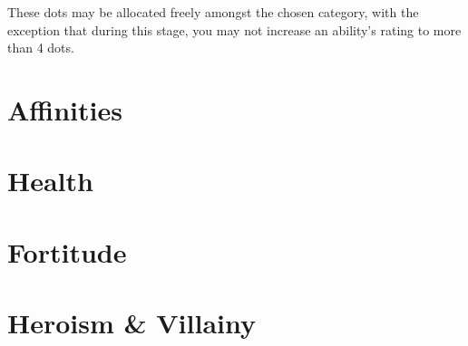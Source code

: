 These dots may be allocated freely amongst the chosen category, with the exception that during this stage, you may not increase an ability's rating to more than 4 dots. 


\section{Affinities} \label{S:Wandchoosing}

\section{Health}


\section{Fortitude}

\section{Heroism \& Villainy}

